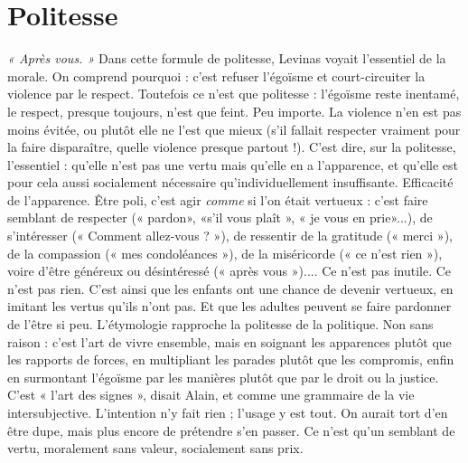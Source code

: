 \section{Politesse}
{\it « Après vous. »} Dans cette formule de politesse, Levinas voyait
l'essentiel de la morale. On comprend pourquoi : c’est refuser
l’égoïsme et court-circuiter la violence par le respect. Toutefois ce n’est que
politesse : l’égoïsme reste inentamé, le respect, presque toujours, n’est que feint.
Peu importe. La violence n’en est pas moins évitée, ou plutôt elle ne l’est que
mieux (s’il fallait respecter vraiment pour la faire disparaître, quelle violence
presque partout !). C’est dire, sur la politesse, l'essentiel : qu’elle n’est pas une
vertu mais qu’elle en a l’apparence, et qu’elle est pour cela aussi socialement
nécessaire qu'individuellement insuffisante. Efficacité de l'apparence. Être poli,
c’est agir {\it comme} si l'on était vertueux : c’est faire semblant de respecter (« pardon»,
«s’il vous plaît », « je vous en prie»...), de s’intéresser (« Comment
allez-vous ? »), de ressentir de la gratitude (« merci »), de la compassion (« mes
condoléances »), de la miséricorde (« ce n’est rien »), voire d’être généreux ou
désintéressé (« après vous »).... Ce n’est pas inutile. Ce n’est pas rien. C’est ainsi
que les enfants ont une chance de devenir vertueux, en imitant les vertus qu’ils
n’ont pas. Et que les adultes peuvent se faire pardonner de l'être si peu.
L’étymologie rapproche la politesse de la politique. Non sans raison : c’est
l’art de vivre ensemble, mais en soignant les apparences plutôt que les rapports
de forces, en multipliant les parades plutôt que les compromis, enfin en surmontant
l’égoïsme par les manières plutôt que par le droit ou la justice. C'est
« l’art des signes », disait Alain, et comme une grammaire de la vie intersubjective.
L'intention n’y fait rien ; l’usage y est tout. On aurait tort d’en être dupe,
mais plus encore de prétendre s’en passer. Ce n’est qu’un semblant de vertu,
moralement sans valeur, socialement sans prix.

